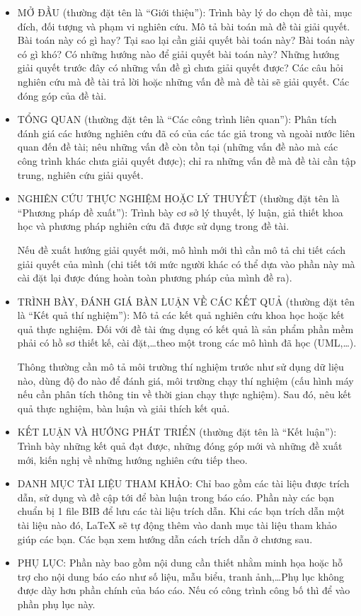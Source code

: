 \begin{itemize}
\item MỞ ĐẦU (thường đặt tên là ``Giới thiệu''): Trình bày lý do chọn đề tài, mục đích, đối tượng và phạm vi nghiên cứu.
Mô tả bài toán mà đề tài giải quyết.
Bài toán này có gì hay?
Tại sao lại cần giải quyết bài toán này?
Bài toán này có gì khó?
Có những hướng nào để giải quyết bài toán này?
Những hướng giải quyết trước đây có những vấn đề gì chưa giải quyết được?
Các câu hỏi nghiên cứu mà đề tài trả lời hoặc những vấn đề mà đề tài sẽ giải quyết.
Các đóng góp của đề tài.

\item TỔNG QUAN (thường đặt tên là ``Các công trình liên quan''): Phân tích đánh giá các hướng nghiên cứu đã có của các tác giả trong và ngoài nước liên quan đến đề tài; nêu những vấn đề còn tồn tại (những vấn đề nào mà các công trình khác chưa giải quyết được); chỉ ra những vấn đề mà đề tài cần tập trung, nghiên cứu giải quyết.

\item NGHIÊN CỨU THỰC NGHIỆM HOẶC LÝ THUYẾT (thường đặt tên là ``Phương pháp đề xuất''): Trình bày cơ sở lý thuyết, lý luận, giả thiết khoa học và phương pháp nghiên cứu đã được sử dụng trong đề tài.

Nếu đề xuất hướng giải quyết mới, mô hình mới thì cần mô tả chi tiết cách giải quyết của mình (chi tiết tới mức người khác có thể dựa vào phần này mà cài đặt lại được đúng hoàn toàn phương pháp của mình đề ra).

\item TRÌNH BÀY, ĐÁNH GIÁ BÀN LUẬN VỀ CÁC KẾT QUẢ (thường đặt tên là ``Kết quả thí nghiệm''): Mô tả các kết quả nghiên cứu khoa học hoặc kết quả thực nghiệm.
Đối với  đề tài ứng dụng có kết quả là sản phẩm phần mềm phải có hồ sơ thiết kế, cài đặt,\ldots theo một trong các mô hình đã học (UML,\ldots).

Thông thường cần mô tả môi trường thí nghiệm trước như sử dụng dữ liệu nào, dùng độ đo nào để đánh giá, môi trường chạy thí nghiệm (cấu hình máy nếu cần phân tích thông tin về thời gian chạy thực nghiệm). Sau đó, nêu kết quả thực nghiệm, bàn luận và giải thích kết quả.

\item KẾT LUẬN VÀ HƯỚNG PHÁT TRIỂN (thường đặt tên là ``Kết luận''): Trình bày những kết quả đạt được, những đóng góp mới và những đề xuất mới, kiến nghị về những hướng nghiên cứu tiếp theo.

\item DANH MỤC TÀI LIỆU THAM KHẢO: Chỉ bao gồm các tài liệu được trích dẫn, sử dụng và đề cập tới để bàn luận trong báo cáo.
Phần này các bạn chuẩn bị 1 file BIB để lưu các tài liệu trích dẫn.
Khi các bạn trích dẫn một tài liệu nào đó, LaTeX sẽ tự động thêm vào danh mục tài liệu tham khảo giúp các bạn.
Các bạn xem hướng dẫn cách trích dẫn ở chương sau.

\item PHỤ LỤC: Phần này bao gồm nội dung cần thiết nhằm minh họa hoặc hỗ trợ cho nội dung báo cáo như số liệu, mẫu biểu, tranh ảnh,\ldots Phụ lục không được dày hơn phần chính của báo cáo.
Nếu có công trình công bố thì để vào phần phụ lục này.
\end{itemize}

